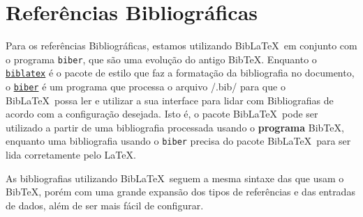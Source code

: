 \section{Referências Bibliográficas}\label{sec:referencias}

Para os referências Bibliográficas, estamos utilizando Bib\LaTeX\ em
conjunto com o programa \verb|biber|, que são uma evolução do antigo
Bib\TeX. Enquanto o
\href{https://linorg.usp.br/CTAN/macros/latex/contrib/biblatex/doc/biblatex.pdf}{\texttt{biblatex}}
é o pacote de estilo que faz a formatação da bibliografia no documento,
o
\href{http://mirrors.ctan.org/biblio/biber/base/documentation/biber.pdf}{\texttt{biber}}
é um programa que processa o arquivo \latexinline/.bib/ para que o
Bib\LaTeX\ possa ler e utilizar a sua interface para lidar com
Bibliografias de acordo com a configuração desejada. Isto é, o pacote
Bib\LaTeX\ pode ser utilizado a partir de uma bibliografia processada
usando o \textbf{programa} Bib\TeX, enquanto uma bibliografia usando o
\verb|biber| precisa do pacote Bib\LaTeX\ para ser lida corretamente
pelo \LaTeX.

As bibliografias utilizando Bib\LaTeX\ seguem a mesma sintaxe das que
usam o Bib\TeX, porém com uma grande expansão dos tipos de referências
e das entradas de dados, além de ser mais fácil de configurar.

